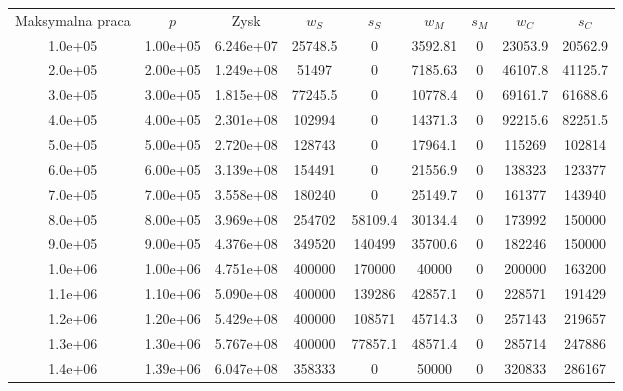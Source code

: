 \documentclass{article}
\begin{document}
\begin{center}
\begin{tabular}{c c c c c c c c c }
  Maksymalna praca& $p$& Zysk & $w_S$& $s_S$& $w_M$& $s_M$& $w_C$& $s_C$ \\
  1.0e+05  &1.00e+05  &6.246e+07  &25748.5  &0        &3592.81  &0  &23053.9  &20562.9 \\
  2.0e+05  &2.00e+05  &1.249e+08  &51497    &0        &7185.63  &0  &46107.8  &41125.7 \\
  3.0e+05  &3.00e+05  &1.815e+08  &77245.5  &0        &10778.4  &0  &69161.7  &61688.6 \\
  4.0e+05  &4.00e+05  &2.301e+08  &102994   &0        &14371.3  &0  &92215.6  &82251.5 \\
  5.0e+05  &5.00e+05  &2.720e+08  &128743   &0        &17964.1  &0  &115269   &102814 \\
  6.0e+05  &6.00e+05  &3.139e+08  &154491   &0        &21556.9  &0  &138323   &123377 \\
  7.0e+05  &7.00e+05  &3.558e+08  &180240   &0        &25149.7  &0  &161377   &143940 \\
  8.0e+05  &8.00e+05  &3.969e+08  &254702   &58109.4  &30134.4  &0  &173992   &150000 \\
  9.0e+05  &9.00e+05  &4.376e+08  &349520   &140499   &35700.6  &0  &182246   &150000 \\
  1.0e+06  &1.00e+06  &4.751e+08  &400000   &170000   &40000    &0  &200000   &163200 \\
  1.1e+06  &1.10e+06  &5.090e+08  &400000   &139286   &42857.1  &0  &228571   &191429 \\
  1.2e+06  &1.20e+06  &5.429e+08  &400000   &108571   &45714.3  &0  &257143   &219657 \\
  1.3e+06  &1.30e+06  &5.767e+08  &400000   &77857.1  &48571.4  &0  &285714   &247886 \\
  1.4e+06  &1.39e+06  &6.047e+08  &358333   &0        &50000    &0  &320833   &286167

\end{tabular} 
\end{center}
\end{document}
